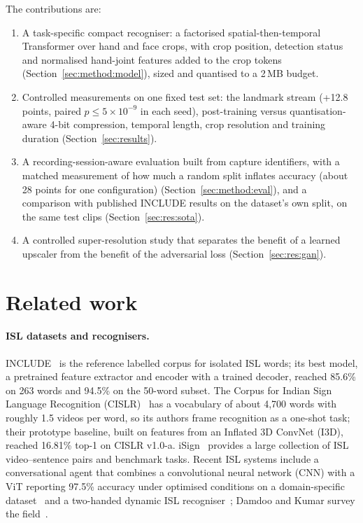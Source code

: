 \documentclass[pdflatex,sn-mathphys-num,twocolumn]{sn-jnl}
\theoremstyle{thmstyleone}%
\begin{document}
The contributions are:
\begin{enumerate}
\item A task-specific compact recogniser: a factorised spatial-then-temporal Transformer over hand and face crops, with crop position, detection status and normalised hand-joint features added to the crop tokens (Section~\ref{sec:method:model}), sized and quantised to a 2\,MB budget.
\item Controlled measurements on one fixed test set: the landmark stream (+12.8 points, paired $p\le 5\times10^{-9}$ in each seed), post-training versus quantisation-aware 4-bit compression, temporal length, crop resolution and training duration (Section~\ref{sec:results}).
\item A recording-session-aware evaluation built from capture identifiers, with a matched measurement of how much a random split inflates accuracy (about 28 points for one configuration) (Section~\ref{sec:method:eval}), and a comparison with published INCLUDE results on the dataset's own split, on the same test clips (Section~\ref{sec:res:sota}).
\item A controlled super-resolution study that separates the benefit of a learned upscaler from the benefit of the adversarial loss (Section~\ref{sec:res:gan}).
\end{enumerate}

\section{Related work}\label{sec:related}

\paragraph{ISL datasets and recognisers.} INCLUDE~\cite{sridhar2020include} is the reference labelled corpus for isolated ISL words; its best model, a pretrained feature extractor and encoder with a trained decoder, reached 85.6\% on 263 words and 94.5\% on the 50-word subset. The Corpus for Indian Sign Language Recognition (CISLR)~\cite{joshi2022cislr} has a vocabulary of about 4,700 words with roughly 1.5 videos per word, so its authors frame recognition as a one-shot task; their prototype baseline, built on features from an Inflated 3D ConvNet (I3D), reached 16.81\% top-1 on CISLR v1.0-a. iSign~\cite{joshi2024isign} provides a large collection of ISL video--sentence pairs and benchmark tasks. Recent ISL systems include a conversational agent that combines a convolutional neural network (CNN) with a ViT reporting 97.5\% accuracy under optimised conditions on a domain-specific dataset~\cite{nedungadi2025vit} and a two-handed dynamic ISL recogniser~\cite{govindharajalu2025isl}; Damdoo and Kumar survey the field~\cite{damdoo2025survey}.
\end{document}
